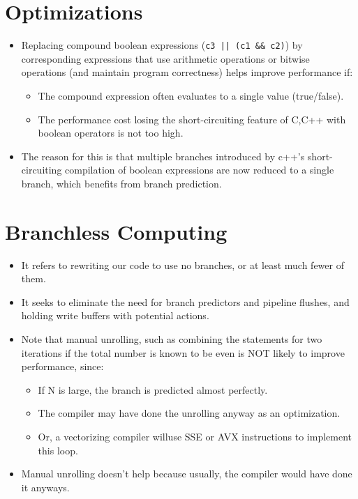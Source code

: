 \documentclass{report}
\begin{document}
\section{Optimizations}
\begin{itemize}
\item Replacing compound boolean expressions (\texttt{c3 || (c1 \&\& c2)}) by corresponding expressions that use arithmetic operations or bitwise operations (and maintain program correctness) helps improve performance if:
\begin{itemize}
    \item The compound expression often evaluates to a single value (true/false).
    \item The performance cost losing the short-circuiting feature of C,C++ with boolean operators is not too high.
\end{itemize}
\item The reason for this is that multiple branches introduced by c++'s short-circuiting compilation of boolean expressions are now reduced to a single branch, which benefits from branch prediction.
\end{itemize}
\section{Branchless Computing}
\begin{itemize}
\item It refers to rewriting our code to use no branches, or at least much fewer of them.
\item It seeks to eliminate the need for branch predictors and pipeline flushes, and holding write buffers with potential actions.
\item Note that manual unrolling, such as combining
the statements for two iterations if the total number is known to be even is NOT likely to improve performance, since:
\begin{itemize}
    \item If N is large, the branch is predicted almost perfectly.
    \item The compiler may have done the unrolling anyway as an optimization.
    \item Or, a vectorizing compiler willuse SSE or AVX instructions to implement this loop.
\end{itemize}
\item Manual unrolling doesn't help because usually, the compiler would have done it anyways.
\end{itemize}
\end{document}
